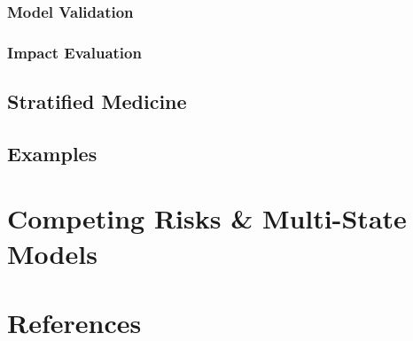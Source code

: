 \documentclass[
]{article}
\begin{document}
\hypertarget{model-validation}{%
\subsubsection{Model Validation}\label{model-validation}}

\hypertarget{impact-evaluation}{%
\subsubsection{Impact Evaluation}\label{impact-evaluation}}

\hypertarget{stratified-medicine}{%
\subsection{Stratified Medicine}\label{stratified-medicine}}

\hypertarget{examples}{%
\subsection{Examples}\label{examples}}

\hypertarget{competing-risks-multi-state-models}{%
\section{Competing Risks \& Multi-State Models}\label{competing-risks-multi-state-models}}

\hypertarget{references}{%
\section*{References}\label{references}}
\end{document}
